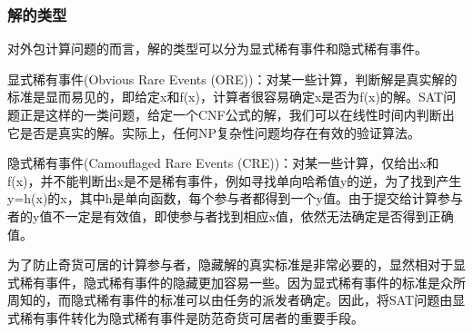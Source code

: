 \subsubsection{解的类型}
对外包计算问题的而言，解的类型可以分为显式稀有事件和隐式稀有事件。

显式稀有事件(Obvious Rare Events (ORE))：对某一些计算，判断解是真实解的标准是显而易见的，即给定x和f(x)，计算者很容易确定x是否为f(x)的解。SAT问题正是这样的一类问题，给定一个CNF公式的解，我们可以在线性时间内判断出它是否是真实的解。实际上，任何NP复杂性问题均存在有效的验证算法。

隐式稀有事件(Camouflaged Rare Events (CRE))：对某一些计算，仅给出x和f(x)，并不能判断出x是不是稀有事件，例如寻找单向哈希值y的逆，为了找到产生y=h(x)的x，其中h是单向函数，每个参与者都得到一个y值。由于提交给计算参与者的y值不一定是有效值，即使参与者找到相应x值，依然无法确定是否得到正确值。

为了防止奇货可居的计算参与者，隐藏解的真实标准是非常必要的，显然相对于显式稀有事件，隐式稀有事件的隐藏更加容易一些。因为显式稀有事件的标准是众所周知的，而隐式稀有事件的标准可以由任务的派发者确定。因此，将SAT问题由显式稀有事件转化为隐式稀有事件是防范奇货可居者的重要手段。

